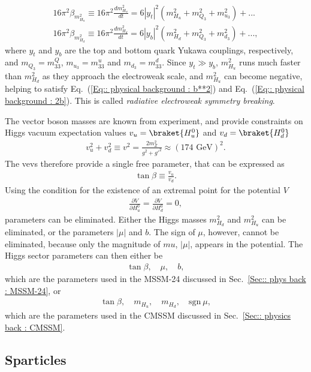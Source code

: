 \documentclass[twoside,english]{uiofysmaster}
\begin{document}
{\begin{align}
16 \pi^2\beta_{m_{H_u}^2} \equiv 16 \pi^2 \frac{d m_{H_u}^2}{dt} = 6 |y_t|^2(m_{H_u}^2 + m_{Q_3}^2 + m_{u_3}^2) +...\\
16 \pi^2\beta_{m_{H_d}^2} \equiv 16 \pi^2 \frac{d m_{H_d}^2}{dt} = 6 |y_b|^2(m_{H_d}^2 + m_{Q_3}^2 + m_{d_3}^2) +...,
\end{align} 
where $y_t$ and $y_b$ are the top and bottom quark Yukawa couplings, respectively, and $m_{Q_3} = m_{33}^Q$, $m_{u_3}= m_{33}^u$ and $m_{d_3} = m_{33}^d$. Since $y_t \gg y_b$, $m_{H_u}^2$ runs much faster than $m_{H_d}^2$ as they approach the electroweak scale, and $m_{H_u}^2$ can become negative, helping to satisfy Eq.~(\ref{Eq:: physical background : b**2}) and Eq.~(\ref{Eq:: physical background : 2b}). This is called \textit{radiative electroweak symmetry breaking}.

The vector boson masses are known from experiment, and provide constraints on Higgs vacuum expectation values $v_u = \braket{H_u^0}$ and $v_d = \braket{H_d^0}$
\begin{align}
v_u^2 + v_d^2 \equiv v^2 = \frac{2m_Z^2}{g^2 + {g'}^2} \approx (174 \text{ GeV})^2.
\end{align} 
The vevs therefore provide a single free parameter, that can be expressed as
\begin{align}
\tan \beta \equiv \frac{v_u}{v_d}.
\end{align}
Using the condition for the existence of an extremal point for the potential $V$
\begin{align}
\frac{\partial V}{\partial H_u^0} = \frac{\partial V}{\partial H_d^0} = 0,
\end{align}
parameters can be eliminated. Either the Higgs masses $m_{H_d}^2$ and $m_{H_u}^2$ can be eliminated, or the parameters $|\mu|$ and $b$. The sign of $\mu$, however, cannot be eliminated, because only the magnitude of $mu$, $|\mu|$, appears in the potential. The Higgs sector parameters can then either be
\begin{align}
\tan \beta, \quad \mu, \quad b,
\end{align}
which are the parameters used in the MSSM-24 discussed in Sec.~\ref{Sec:: phys back : MSSM-24}, or 
\begin{align}
\tan \beta, \quad m_{H_u}, \quad m_{H_d}, \quad \mathrm{sgn}~\mu,
\end{align}
which are the parameters used in the CMSSM discussed in Sec.~\ref{Sec:: physics back : CMSSM}.

\subsection{Sparticles}

}
\end{document}
